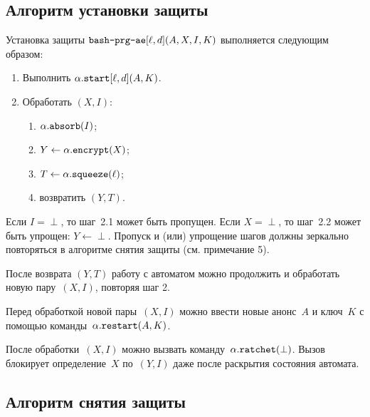 \subsection{Алгоритм установки защиты}\label{PRG.AE.Wrap}

Установка защиты $\texttt{bash-prg-ae}[\ell,d](A,X,I,K)$ выполняется следующим 
образом:
\begin{enumerate}
\item
Выполнить $\alpha.\texttt{start}[\ell,d](A,K)$.
\item
Обработать $(X,I)$:
\begin{enumerate}
\item
$\alpha.\texttt{absorb}(I)$;
\item
$Y\leftarrow\alpha.\texttt{encrypt}(X)$;
\item
$T\leftarrow \alpha.\texttt{squeeze}(\ell)$;
\item
возвратить $(Y,T)$.
\end{enumerate}
\end{enumerate}

\begin{note}
Если $I=\perp$, то шаг~2.1 может быть пропущен.
%
Если $X=\perp$, то шаг~2.2 может быть упрощен: $Y\leftarrow\perp$.
%
Пропуск и (или) упрощение шагов должны зеркально повторяться в алгоритме снятия 
защиты (см. примечание 5).
\end{note}

\begin{note}
После возврата $(Y,T)$ работу с автоматом
можно продолжить и обработать новую пару~$(X,I)$, повторяя шаг 2.
\end{note}

\begin{note}
Перед обработкой новой пары~$(X,I)$ можно ввести новые анонс~$A$ и ключ~$K$ с 
помощью команды~$\alpha.\texttt{restart}(A, K)$.
\end{note}

\begin{note}
После обработки~$(X,I)$ можно вызвать 
команду~$\alpha.\texttt{ratchet}(\perp)$. Вызов блокирует определение~$X$ 
по~$(Y,I)$ даже после раскрытия состояния автомата.
\end{note}

\subsection{Алгоритм снятия защиты}\label{PRG.AE.Unwrap}


